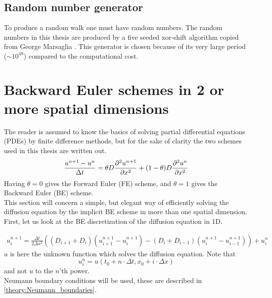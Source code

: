 \subsection{Random number generator}

To produce a random walk one must have random numbers. 
The random numbers in this thesis are produced by a five seeded xor-shift algorithm copied from George Marsaglia \cite{marsaglia2003xorshift}. 
This generator is chosen because of its very large period ($\sim10^{48}$) compared to the computational cost.

\section{Backward Euler schemes in 2 or more spatial dimensions}

The reader is assumed to know the basics of solving partial differential equations (PDEs) by finite difference methods, but for the sake of clarity the two schemes used in this thesis are written out. 
\begin{equation}\label{theory_theta_rule}
 \frac{u^{n+1}-u^n}{\Delta t} = \theta D\frac{\partial^2 u^{n+1}}{\partial x^2} + (1-\theta)D\frac{\partial^2 u^{n}}{\partial x^2}
\end{equation}
\noindent Having $\theta = 0$ gives the Forward Euler (FE) scheme, and $\theta = 1$ gives the  Backward Euler (BE) scheme. \\
This section will concern a simple, but elegant way of efficiently solving the diffusion equation by the implicit BE scheme in more than one spatial dimension. 
First, let us look at the BE discretization of the diffusion equation in 1D. 

\begin{align}\label{theory:BE_scheme_1D}
 u^{n+1}_i = \frac{\Delta t}{2\Delta x^2}\left((D_{i+1}+D_{i})(u^{n+1}_{i+1}-u^{n+1}_{i})-(D_{i}+D_{i-1})(u^{n+1}_{i}-u^{n+1}_{i-1})\right) + u^n_i
\end{align}
$u$ is here the unknown function which solves the diffusion equation. 
Note that 
$$u^n_i = u(t_0+n\cdot\Delta t,x_0+i\cdot\Delta x)$$
and not $u$ to the $n$'th power. \\
Neumann boundary conditions will be used, these are described in \eqref{theory:Neumann_boundaries}.


